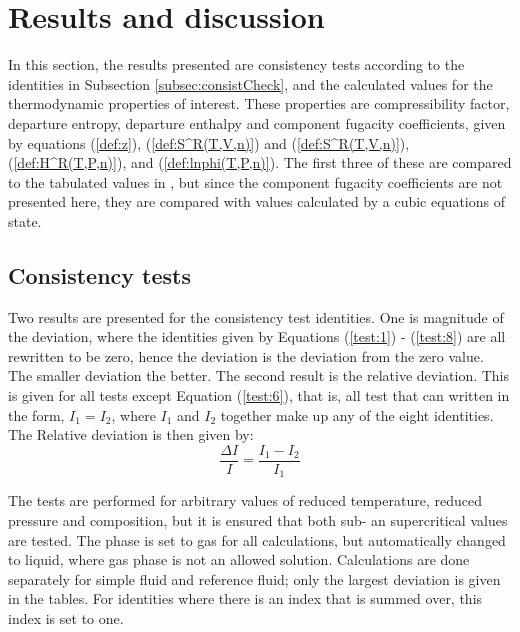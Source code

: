 \documentclass[english]{../thermomemo/thermomemo}
\numberwithin{equation}{section}
\newcommand*{\reff}[1]{(\ref{#1})}
\begin{document}
\section{Results and discussion}
In this section, the results presented are consistency tests according to the identities in Subsection \ref{subsec:consistCheck}, and the calculated values for the thermodynamic properties of interest. These properties are compressibility factor, departure entropy, departure enthalpy and component fugacity coefficients, given by equations \reff{def:z}, \reff{def:S^R(T,V,n)} and \reff{def:S^R(T,V,n)}, \reff{def:H^R(T,P,n)}, and \reff{def:lnphi(T,P,n)}. The first three of these are compared to the tabulated values in \cite{LK}, but since the component fugacity coefficients are not presented here, they are compared with values calculated by a cubic equations of state.

\subsection{Consistency tests}
Two results are presented for the consistency test identities. One is magnitude of the deviation, where the identities given by Equations \reff{test:1} - \reff{test:8} are all rewritten to be zero, hence the deviation is the deviation from the zero value. The smaller deviation the better. The second result is the relative deviation. This is given for all tests except Equation \reff{test:6}, that is, all test that can written in the form, $I_1 = I_2$, where $I_1$ and $I_2$ together make up any of the eight identities. The Relative deviation is then given by:
\begin{equation}
\frac{\Delta I}{I} = \frac{I_1 - I_2}{I_1}
\end{equation}

The tests are performed for arbitrary values of reduced temperature, reduced pressure and composition, but it is ensured that both sub- an supercritical values are tested. The phase is set to gas for all calculations, but automatically changed to liquid, where gas phase is not an allowed solution. Calculations are done separately for simple fluid and reference fluid; only the largest deviation is given in the tables. For identities where there is an index that is summed over, this index is set to one.
\end{document}
